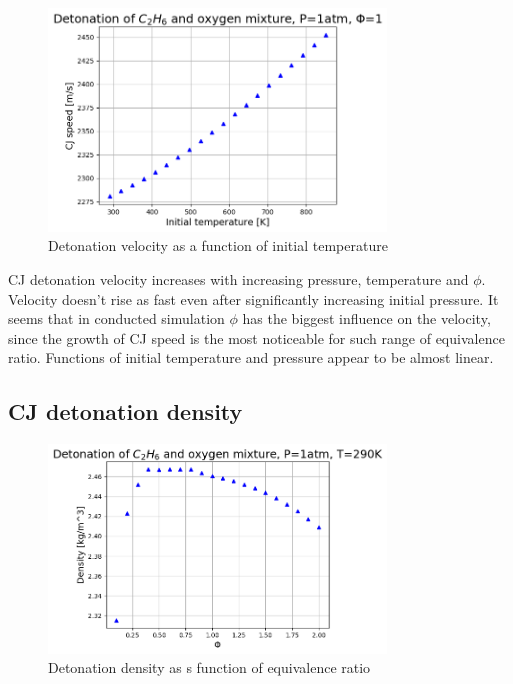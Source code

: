 \documentclass[a4paper]{article}
\begin{document}
\begin{figure}[H]
\centering
\includegraphics[width=0.8\textwidth]{CJspeed_Ti.png}
\caption{Detonation velocity as a function of initial temperature}
\end{figure}

CJ detonation velocity increases with increasing pressure, temperature and $\phi$. Velocity doesn't rise as fast even after significantly increasing initial pressure. It seems that in conducted simulation $\phi$ has the biggest influence on the velocity, since the growth of CJ speed is the most noticeable for such range of equivalence ratio. Functions of initial temperature and pressure appear to be almost linear.

\subsection{CJ detonation density}
\begin{figure}[H]
\centering
\includegraphics[width=0.8\textwidth]{density_Fi.png}
\caption{Detonation density as s function of equivalence ratio}
\end{figure}
\end{document}
